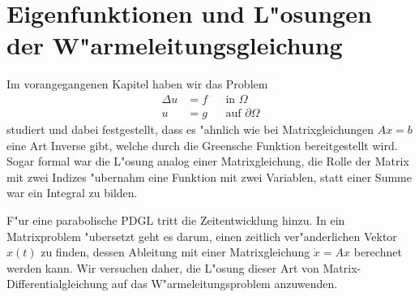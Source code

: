 \section{Eigenfunktionen und L"osungen der W"armeleitungsgleichung}
Im vorangegangenen Kapitel haben wir das Problem
\begin{align*}
\Delta u&=f&&\text{in $\Omega$}\\
u&=g&&\text{auf $\partial\Omega$}
\end{align*}
studiert und dabei festgestellt, dass es "ahnlich wie bei Matrixgleichungen
$Ax=b$ eine Art Inverse gibt, welche durch die Greensche Funktion
bereitgestellt wird. Sogar formal war die L"osung analog einer Matrixgleichung,
die Rolle der Matrix mit zwei Indizes "ubernahm eine Funktion mit zwei
Variablen, statt einer Summe war ein Integral zu bilden.

F"ur eine parabolische PDGL tritt die Zeitentwicklung hinzu. In
ein Matrixproblem "ubersetzt geht es darum, einen zeitlich
ver"anderlichen Vektor $x(t)$ zu finden, dessen Ableitung mit einer
Matrixgleichung $\dot x=Ax$ berechnet werden kann. Wir versuchen daher,
die L"osung dieser Art von Matrix-Differentialgleichung auf das
W"armeleitungsproblem anzuwenden.

